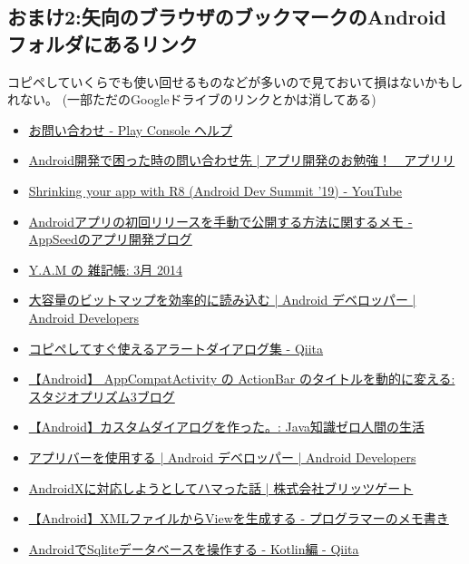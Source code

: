 \documentclass[dvipdfmx,jb5]{jarticle}
\newcommand{\link}[2]{\href{#2}{#1}}
\begin{document}
\subsection{おまけ2:矢向のブラウザのブックマークのAndroidフォルダにあるリンク}
コピペしていくらでも使い回せるものなどが多いので見ておいて損はないかもしれない。
(一部ただのGoogleドライブのリンクとかは消してある)
\begin{itemize}
\item \link{お問い合わせ - Play Console ヘルプ}{https://support.google.com/googleplay/android-developer/gethelp?hl=ja\&visit\_id=637678981545128687-2809304254\&rd=1\#}
\item \link{Android開発で困った時の問い合わせ先 | アプリ開発のお勉強！　アプリリ}{https://bit.ly/3on3bmL}
\item \link{Shrinking your app with R8 (Android Dev Summit '19) - YouTube}{https://www.youtube.com/watch?v=uQ_yK8kRCaA}
\item \link{Androidアプリの初回リリースを手動で公開する方法に関するメモ - AppSeedのアプリ開発ブログ}{https://develop.hateblo.jp/entry/google-play-manual-release}
\item \link{Y.A.M の 雑記帳: 3月 2014}{http://y-anz-m.blogspot.com/2014/03/}
\item \link{大容量のビットマップを効率的に読み込む  |  Android デベロッパー  |  Android Developers}{https://developer.android.com/topic/performance/graphics/load-bitmap?hl=ja}
\item \link{コピペしてすぐ使えるアラートダイアログ集 - Qiita}{https://qiita.com/suzukihr/items/8973527ebb8bb35f6bb8}
\item \link{【Android】 AppCompatActivity の ActionBar のタイトルを動的に変える: スタジオプリズム\UTF{3427}3ブログ}{http://s-prism3.seesaa.net/article/438905821.html}
\item \link{【Android】カスタムダイアログを作った。: Java知識ゼロ人間の生活}{http://stren-blog.seesaa.net/article/367038846.html}
\item \link{アプリバーを使用する  |  Android デベロッパー  |  Android Developers}{https://developer.android.com/guide/fragments/appbar?hl=ja}
\item \link{AndroidXに対応しようとしてハマった話 | 株式会社ブリッツゲート}{https://blitzgate.co.jp/blog/2350/}
\item \link{【Android】XMLファイルからViewを生成する - プログラマーのメモ書き}{https://bit.ly/3wDqZq9}
\item \link{AndroidでSqliteデータベースを操作する - Kotlin編 - Qiita}{https://qiita.com/NaoSekig/items/0d95d631378040c1961a}

\end{itemize}
\end{document}
